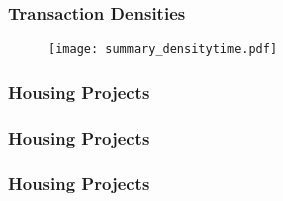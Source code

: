\documentclass[aspectratio=149]{beamer}
\begin{document}

\begin{frame}
\frametitle{Transaction Densities}
\begin{center}
\begin{figure}
\texttt{[image: summary\_densitytime.pdf]}
\vspace{-3mm}
\end{figure}
\end{center}
\end{frame}



\begin{frame}
\frametitle{Housing Projects}
\vspace{-1.5mm}
\begin{table}
{\footnotesize

}
\end{table}
\end{frame}


\begin{frame}
\frametitle{Housing Projects}
\vspace{-1.5mm}
\begin{table}
{\footnotesize

}
\end{table}
\end{frame}


\begin{frame}
\frametitle{Housing Projects}
\vspace{-1.5mm}
\begin{table}
{\footnotesize

}
\end{table}
\end{frame}


%

\end{document}
